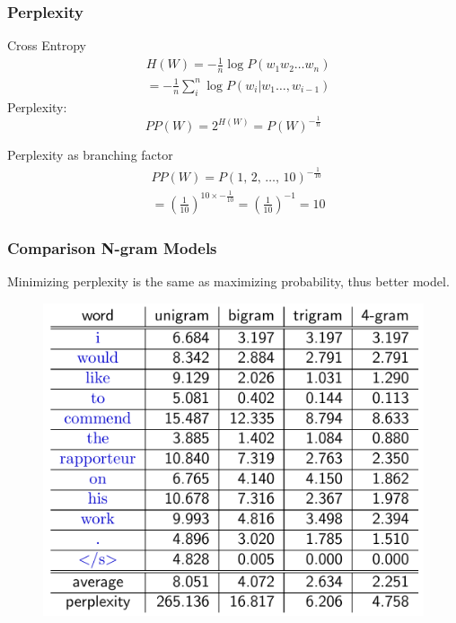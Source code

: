 \documentclass{beamer}
\begin{document}
\begin{frame}\frametitle{Perplexity}

\begin{block}{Cross Entropy}
\begin{align*}
& H(W) =  -\frac{1}{n}\log{P(w_1w_2\ldots w_n)}  \\
& = -\frac{1}{n}\sum_i^n\log{P(w_i|w_1\ldots,w_{i-1})} 
\end{align*}
Perplexity:
$$
PP(W) = 2^{H(W)} = P(W)^{-\frac{1}{n}}
$$
\end{block}

\begin{block}{Perplexity as branching factor}
\begin{align*}
& PP(W) =  P(1\text{, }2\text{, }\ldots\text{, } 10)^{-\frac{1}{10}}  \\
& =(\frac{1}{10})^{10\times -\frac{1}{10}} = (\frac{1}{10})^{-1} = 10 
\end{align*}
\end{block}

\end{frame}


\begin{frame}\frametitle{Comparison N-gram Models}

Minimizing perplexity is the same as maximizing probability, thus
better model.

\begin{figure}
\includegraphics[width=0.6\linewidth]{figure/comparison_perplexity.pdf}
\label{fig:comparison_perplexity}
\end{figure}

\end{frame}
\end{document}
